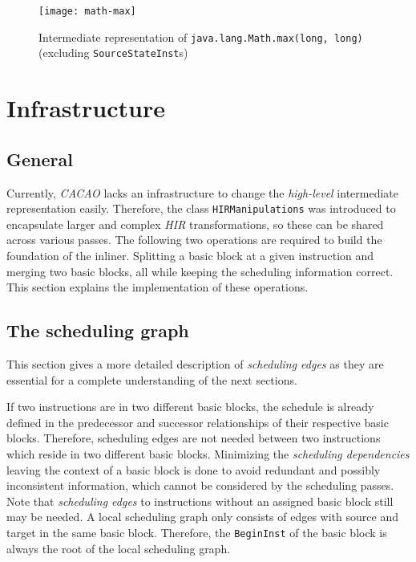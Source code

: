 \documentclass[draft, final]{vutinfth} %
\begin{document}
\begin{figure}
\center
\texttt{[image: math-max]}
\caption{Intermediate representation of \texttt{java.lang.Math.max(long, long)} (excluding \texttt{SourceStateInst}s) }
\label{fig:math-max}
\end{figure}

\section{Infrastructure}
\label{sec:infrastructure}

\subsection{General}

Currently, \emph{CACAO} lacks an infrastructure to change the \emph{high-level} intermediate representation easily. Therefore, the class \texttt{HIRManipulations} was introduced to encapsulate larger and complex \emph{HIR} transformations, so these can be shared across various passes. The following two operations are required to build the foundation of the inliner. Splitting a basic block at a given instruction and merging two basic blocks, all while keeping the scheduling information correct. This section explains the implementation of these operations.

\subsection{The scheduling graph}
\label{sec:scheduling-graph}

This section gives a more detailed description of \emph{scheduling edges} as they are essential for a complete understanding of the next sections. 

If two instructions are in two different basic blocks, the schedule is already defined in the predecessor and successor relationships of their respective basic blocks. Therefore, scheduling edges are not needed between two instructions which reside in two different basic blocks. Minimizing the \emph{scheduling dependencies} leaving the context of a basic block is done to avoid redundant and possibly inconsistent information, which cannot be considered by the scheduling passes. Note that \emph{scheduling edges} to instructions without an assigned basic block still may be needed. A local scheduling graph only consists of edges with source and target in the same basic block. Therefore, the \texttt{BeginInst} of the basic block is always the root of the local scheduling graph.
\end{document}

